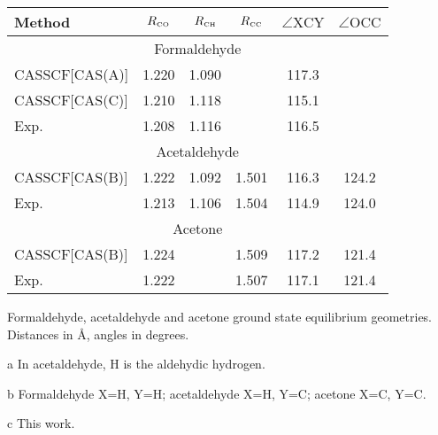\begin{center}
\begin{threeparttable}
\footnotesize
\begin{tabular*}{0.80\textwidth}{lccccc}
\hline
Method 						& $R_{\mbox{\tiny CO}}$	& $R_{\mbox{\tiny
CH}}$\tnote{a} & $R_{\mbox{\tiny CC}}$ & $\angle \mbox{XCY}$\tnote{b} 	& $\angle \mbox{OCC}$ \\	
\hline
\multicolumn{6}{c}{\small Formaldehyde} \\
CASSCF[CAS(A)]\tnote{c} 	& 1.220		& 1.090				& 			& 117.3					&       	 \\
CASSCF[CAS(C)]\tnote{c}		& 1.210		& 1.118				& 			& 115.1					&       	 \\
Exp.\cite{jpsj-18-1174-1963}& 1.208		& 1.116				& 			& 116.5					&       	 \\
\multicolumn{6}{c}{\small Acetaldehyde} \\                                                     
CASSCF[CAS(B)]\tnote{c}		& 1.222		& 1.092				& 1.501 	& 116.3					& 124.2   	 \\
Exp.\cite{jpc-8-619-1979}	& 1.213		& 1.106				& 1.504		& 114.9					& 124.0    	 \\
\multicolumn{6}{c}{\small Acetone} \\                                                          
CASSCF[CAS(B)]\tnote{c}		& 1.224		& 					& 1.509 	& 117.2					& 121.4   	 \\
Exp.\cite{jms-18-344-1965}	& 1.222		&      				& 1.507		& 117.1					& 121.4    	 \\
\hline
\end{tabular*}
\caption{\footnotesize Formaldehyde, acetaldehyde and acetone ground state
equilibrium geometries.  Distances in \AA, angles in
degrees.\label{tbl:gs_geometries}}
\begin{tablenotes}
\footnotesize
\item[a] In acetaldehyde, H is the aldehydic hydrogen.
\item[b] Formaldehyde X=H, Y=H; acetaldehyde X=H, Y=C; acetone X=C, Y=C.
\item[c] This work.
\end{tablenotes}
\end{threeparttable}
\end{center}

